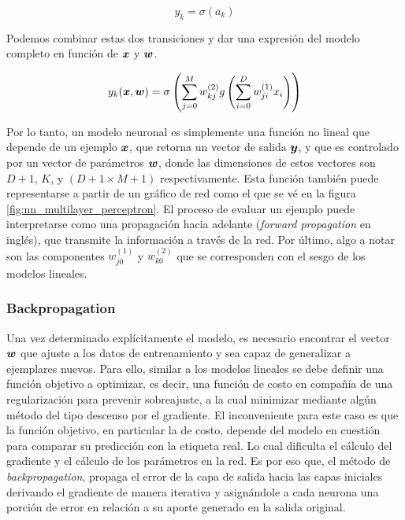 \begin{equation}
    y_{k} = \sigma\left( a_k \right)
\end{equation}

Podemos combinar estas dos transiciones y dar una expresión del modelo completo
en función de $\boldsymbol{x}$ y $\boldsymbol{w}$.

\begin{equation}
    y_k(\boldsymbol{x}, \boldsymbol{w}) = \sigma\left(
                \sum_{j=0}^{M} w_{kj}^{(2)}
                    g\left( \sum_{i = 0}^{D} w_{ji}^{(1)} x_{i}
                \right)
            \right)
\end{equation}

Por lo tanto, un modelo neuronal es simplemente una función no lineal que depende
de un ejemplo $\boldsymbol{x}$, que retorna un vector de salida $\boldsymbol{y}$, y que es
controlado por un vector de parámetros $\boldsymbol{w}$, donde las dimensiones de
estos vectores son $D + 1$, $K$, y $(D + 1 \times M + 1)$ respectivamente. Esta
función también puede representarse a partir de un gráfico de red como el que se
vé en la figura \ref{fig:nn_multilayer_perceptron}. El proceso de evaluar un
ejemplo puede interpretarse como una propagación hacia adelante (\emph{forward
propagation} en inglés), que transmite la información a través de la red. Por
último, algo a notar son las componentes $w_{j0}^{(1)}$ y $w_{k0}^{(2)}$ que se
corresponden con el sesgo de los modelos lineales.

\subsubsection{Backpropagation}
\label{subch:backpropagation}

Una vez determinado explícitamente el modelo, es necesario encontrar el vector
$\boldsymbol{w}$ que ajuste a los datos de entrenamiento y sea capaz de generalizar a
ejemplares nuevos. Para ello, similar a los modelos lineales se debe definir una
función objetivo a optimizar, es decir, una función de costo en compañía de una
regularización para prevenir sobreajuste, a la cual minimizar mediante algún
método del tipo descenso por el gradiente. El inconveniente para este caso es
que la función objetivo, en particular la de costo, depende del modelo en
cuestión para comparar su predicción con la etiqueta real. Lo cual dificulta el
cálculo del gradiente y el cálculo de los parámetros en la red. Es por eso que,
el método de \emph{backpropagation}, propaga el error de la capa de salida hacia
las capas iniciales derivando el gradiente de manera iterativa y asignándole a
cada neurona una porción de error en relación a su aporte generado en la salida
original.

